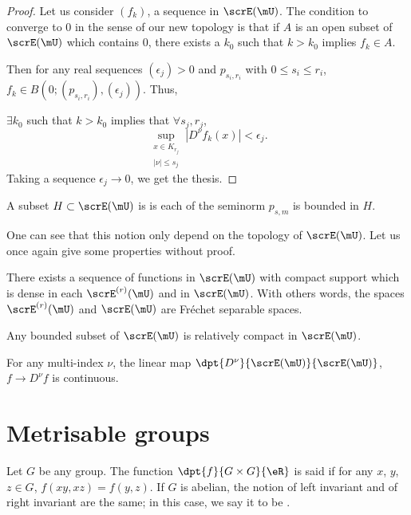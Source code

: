 \begin{proof}
Let us consider $(f_k)$, a sequence in $\scrE(\mU)$. The condition to converge to $0$ in the sense of our new topology is that if $A$ is an open subset of $\scrE(\mU)$ which contains $0$, there exists a $k_0$ such that $k>k_0$ implies $f_k\in A$.

Then for any real sequences $(\epsilon_j)>0$ and $p_{s_i,r_i}$ with $0\leq s_i\leq r_i$, $f_k\in B( 0;(p_{s_i,r_i}),(\epsilon_j) )$. Thus,

$\exists k_0$ such that $k>k_0$ implies that $\forall s_j,r_j$,
\[
   \sup_{ \substack{ x\in K_{r_j}\\|\nu|\leq s_j } }|D^{\nu}f_k(x)|<\epsilon_j.
\]
Taking a sequence $\epsilon_j\to 0$, we get the thesis.
\end{proof}


\begin{definition}
A subset $H\subset\scrE(\mU)$ is  is each of the seminorm $p_{s,m}$ is bounded in $H$.
\label{def:bounded}
\end{definition}
One can see that this notion only depend on the topology of $\scrE(\mU)$. Let us once again give some properties without proof.

\begin{proposition}
There exists a sequence of functions in $\scrE(\mU)$ with compact support which is dense in each $\scrE^{(r)}(\mU)$ and in $\scrE(\mU)$. With others words, the spaces $\scrE^{(r)}(\mU)$ and $\scrE(\mU)$ are Fréchet separable spaces.
\label{prop:E_Frechet}
\end{proposition}

\begin{proposition}
Any bounded subset of $\scrE(\mU)$ is relatively compact in $\scrE(\mU)$.
\end{proposition}

\begin{proposition}
For any multi-index $\nu$, the linear map $\dpt{D^{\nu}}{\scrE(\mU)}{\scrE(\mU)}$, $f\to D^{\nu}f$ is continuous.
\end{proposition}


\section{Metrisable groups}\label{sec:metrisable_groups}

Let $G$ be any group. The function $\dpt{f}{G\times G}{\eR}$ is said  if for any $x$, $y$, $z\in G$, $f(xy,xz)=f(y,z)$. If $G$ is abelian, the notion of left invariant and of right invariant are the same; in this case, we say it to be .

